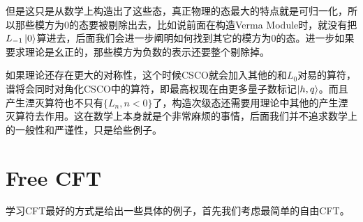但是这只是从数学上构造出了这些态，真正物理的态最大的特点就是可归一化，所以那些模方为0的态要被剔除出去，比如说前面在构造Verma Module时，就没有把$L_{-1}\ket{0}$算进去，后面我们会进一步阐明如何找到其它的模方为0的态。进一步如果要求理论是幺正的，那些模方为负数的表示还要整个剔除掉。

如果理论还存在更大的对称性，这个时候CSCO就会加入其他的和${L_0}$对易的算符，谱将会同时对角化CSCO中的算符，即最高权现在由更多量子数标记$\ket{h,q}$。而且产生湮灭算符也不只有$\{L_{n},n<0\}$了，构造次级态还需要用理论中其他的产生湮灭算符去作用。这在数学上本身就是个非常麻烦的事情，后面我们并不追求数学上的一般性和严谨性，只是给些例子。

\section{Free CFT}
学习CFT最好的方式是给出一些具体的例子，首先我们考虑最简单的自由CFT。
